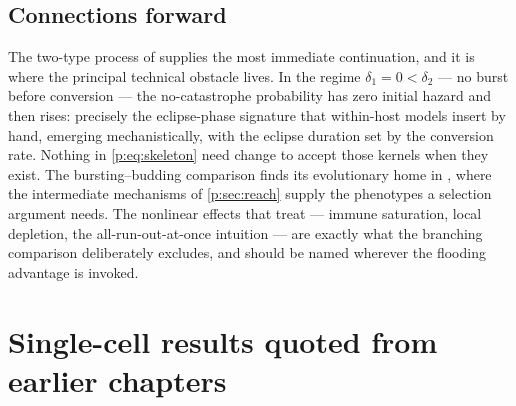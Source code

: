 \subsection{Connections forward}

The two-type process of \ChTwoType{} supplies the most immediate
continuation, and it is where the principal technical obstacle lives. In the
regime $\delta_1=0<\delta_2$ --- no burst before conversion --- the
no-catastrophe probability has zero initial hazard and then rises: precisely
the eclipse-phase signature that within-host models insert by hand, emerging
mechanistically, with the eclipse duration set by the conversion rate.
Nothing in \cref{p:eq:skeleton} need change to accept those kernels when
they exist. The bursting--budding comparison finds its evolutionary home in
\ChPath{}, where the intermediate mechanisms of \cref{p:sec:reach} supply
the phenotypes a selection argument needs. The nonlinear effects that
 treat --- immune saturation,
local depletion, the all-run-out-at-once intuition --- are exactly what the
branching comparison deliberately excludes, and should be named wherever the
flooding advantage is invoked.

\FloatBarrier

\begingroup
\renewcommand{\theHsection}{\thechapter.appendix.\Alph{section}}
\renewcommand{\theHsubsection}{\theHsection.\arabic{subsection}}
\renewcommand{\thesection}{\thechapter.\Alph{section}}
\setcounter{section}{0}

\section{Single-cell results quoted from earlier chapters}
\label{p:app:quoted}


